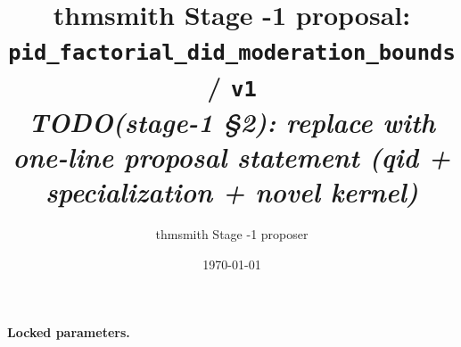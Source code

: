 \documentclass[11pt]{article}
\title{thmsmith Stage -1 proposal: \texttt{pid\_factorial\_did\_moderation\_bounds} / \texttt{v1}%
  \\ \large\textit{TODO(stage-1 \S2): replace with one-line proposal statement (qid + specialization + novel kernel)}}
\author{thmsmith Stage -1 proposer}
\date{\today}
\theoremstyle{definition}
\theoremstyle{plain}
\theoremstyle{remark}
\begin{document}
\maketitle


\paragraph{Locked parameters.}

\begin{abstract}
\end{abstract}
\end{document}
